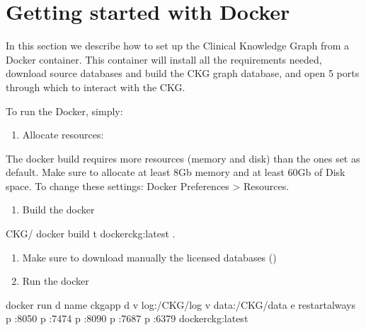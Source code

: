 \documentclass[letterpaper,10pt,english]{sphinxmanual}
\begin{document}
\section{Getting started with Docker }
\label{\detokenize{intro/getting-started-with-docker:getting-started-with-docker-testing}}\label{\detokenize{intro/getting-started-with-docker::doc}}
In this section we describe how to set up the Clinical Knowledge Graph from a Docker container.
This container will install all the requirements needed, download source databases and build the CKG graph database, and open 5 ports through which to interact with the CKG.

To run the Docker, simply:
\begin{enumerate}
%
\item {} 
Allocate resources:

\end{enumerate}

The docker build requires more resources (memory and disk) than the ones set as default. Make sure to allocate at least 8Gb memory and at least 60Gb of Disk space. To change these settings: Docker Preferences \sphinxhyphen{}\textgreater{} Resources.
\begin{enumerate}
%
\setcounter{enumi}{1}
\item {} 
Build the docker

\end{enumerate}

\begin{sphinxVerbatim}[commandchars=\\\{\}]
\PYGZdl{}  CKG/
\PYGZdl{} docker build \PYGZhy{}t docker\PYGZhy{}ckg:latest .
\end{sphinxVerbatim}
\begin{enumerate}
%
\setcounter{enumi}{2}
\item {} 
Make sure to download manually the licensed databases ({\hyperref[\detokenize{intro/getting-started-with-build:build-neo4j-graph-database}]{}})

\item {} 
Run the docker

\end{enumerate}

\begin{sphinxVerbatim}[commandchars=\\\{\}]
\PYGZdl{} docker run \PYGZhy{}d \PYGZhy{}\PYGZhy{}name ckgapp \PYGZhy{}d \PYGZhy{}v log:/CKG/log \PYGZhy{}v data:/CKG/data \PYGZhy{}e  \PYGZhy{}\PYGZhy{}restartalways \PYGZhy{}p :8050 \PYGZhy{}p :7474 \PYGZhy{}p :8090 \PYGZhy{}p :7687 \PYGZhy{}p :6379 docker\PYGZhy{}ckg:latest
\end{sphinxVerbatim}
\end{document}
